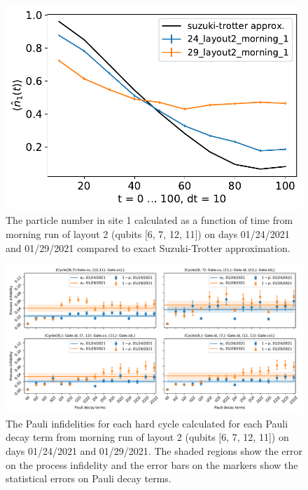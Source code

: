 \begin{figure}[H]
    \includegraphics[scale=0.5]{TIM_[24, 29]_[layout2]_[morning]_n1.pdf}
    \caption{The particle number in site 1 calculated as a function of time from morning run of layout 2 (qubits [6, 7, 12, 11]) on days 01/24/2021 and 01/29/2021 compared to exact Suzuki-Trotter approximation.}
    \label{fig:n1_Story4}
\end{figure}




\begin{figure}[ht!]
    \includegraphics[scale=0.56]{CBPauliInfidelities_24_29_01_2021_MorningRun_Layout2_Cycle1_2_3_4.pdf}
    \caption{The Pauli infidelities for each hard cycle calculated for each Pauli decay term from morning run of layout 2 (qubits [6, 7, 12, 11]) on days 01/24/2021 and 01/29/2021. The shaded regions show the error on the process infidelity and the error bars on the markers show the statistical errors on Pauli decay terms. }
    \label{fig:PauliInfidelities27_29_Story4}
\end{figure}



